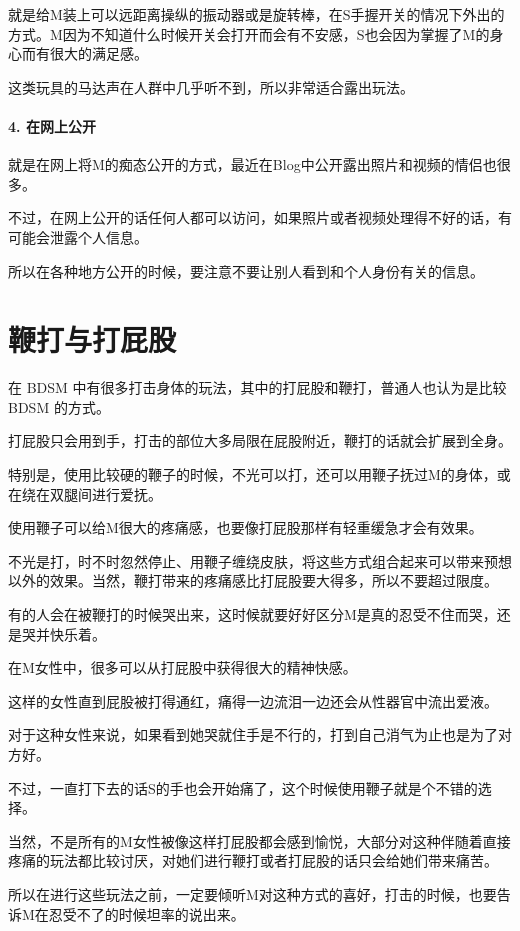 \documentclass[12pt,UTF8]{ctexbook}
\begin{document}
就是给M装上可以远距离操纵的振动器或是旋转棒，在S手握开关的情况下外出的方式。M因为不知道什么时候开关会打开而会有不安感，S也会因为掌握了M的身心而有很大的满足感。

这类玩具的马达声在人群中几乎听不到，所以非常适合露出玩法。

\paragraph{4. 在网上公开}

就是在网上将M的痴态公开的方式，最近在Blog中公开露出照片和视频的情侣也很多。

不过，在网上公开的话任何人都可以访问，如果照片或者视频处理得不好的话，有可能会泄露个人信息。

所以在各种地方公开的时候，要注意不要让别人看到和个人身份有关的信息。

\section{鞭打与打屁股}

在 BDSM 中有很多打击身体的玩法，其中的打屁股和鞭打，普通人也认为是比较 BDSM 的方式。

打屁股只会用到手，打击的部位大多局限在屁股附近，鞭打的话就会扩展到全身。

特别是，使用比较硬的鞭子的时候，不光可以打，还可以用鞭子抚过M的身体，或在绕在双腿间进行爱抚。

使用鞭子可以给M很大的疼痛感，也要像打屁股那样有轻重缓急才会有效果。

不光是打，时不时忽然停止、用鞭子缠绕皮肤，将这些方式组合起来可以带来预想以外的效果。当然，鞭打带来的疼痛感比打屁股要大得多，所以不要超过限度。

有的人会在被鞭打的时候哭出来，这时候就要好好区分M是真的忍受不住而哭，还是哭并快乐着。

在M女性中，很多可以从打屁股中获得很大的精神快感。

这样的女性直到屁股被打得通红，痛得一边流泪一边还会从性器官中流出爱液。

对于这种女性来说，如果看到她哭就住手是不行的，打到自己消气为止也是为了对方好。

不过，一直打下去的话S的手也会开始痛了，这个时候使用鞭子就是个不错的选择。

当然，不是所有的M女性被像这样打屁股都会感到愉悦，大部分对这种伴随着直接疼痛的玩法都比较讨厌，对她们进行鞭打或者打屁股的话只会给她们带来痛苦。

所以在进行这些玩法之前，一定要倾听M对这种方式的喜好，打击的时候，也要告诉M在忍受不了的时候坦率的说出来。
\end{document}
